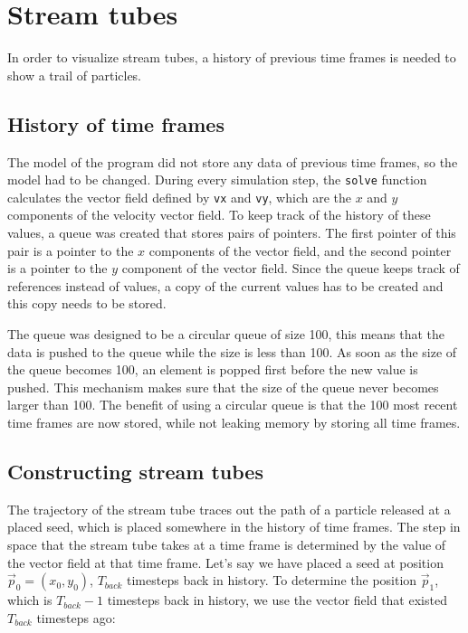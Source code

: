 \section{Stream tubes}
\label{sec:stream_tubes}
In order to visualize stream tubes, a history of previous time frames is needed to show a trail of particles.

\subsection{History of time frames}
The model of the program did not store any data of previous time frames, so the model had to be changed. 
During every simulation step, the \texttt{solve} function calculates the vector field defined by \texttt{vx} and \texttt{vy}, which are the \(x\) and \(y\) components of the velocity vector field.
To keep track of the history of these values, a queue was created that stores pairs of pointers.
The first pointer of this pair is a pointer to the \(x\) components of the vector field, and the second pointer is a pointer to the \(y\) component of the vector field.
Since the queue keeps track of references instead of values, a copy of the current values has to be created and this copy needs to be stored.

The queue was designed to be a circular queue of size 100, this means that the data is pushed to the queue while the size is less than 100.
As soon as the size of the queue becomes 100, an element is popped first before the new value is pushed.
This mechanism makes sure that the size of the queue never becomes larger than 100. 
The benefit of using a circular queue is that the 100 most recent time frames are now stored, while not leaking memory by storing all time frames.

\subsection{Constructing stream tubes}
The trajectory of the stream tube traces out the path of a particle released at a placed seed, which is placed somewhere in the history of time frames.
The step in space that the stream tube takes at a time frame is determined by the value of the vector field at that time frame.
Let's say we have placed a seed at position \(\vec{p}_0 = \left(x_0, y_0\right)\), \(T_{back}\) timesteps back in history.
To determine the position \(\vec{p}_1\), which is \(T_{back} - 1\) timesteps back in history, we use the vector field that existed \(T_{back}\) timesteps ago:

